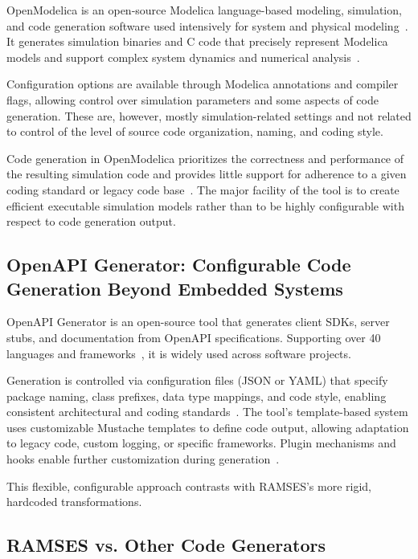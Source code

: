 OpenModelica is an open-source Modelica language-based modeling, simulation, and code generation software used intensively for system and physical modeling~\cite{openmodelica-home}. It generates simulation binaries and C code that precisely represent Modelica models and support complex system dynamics and numerical analysis~\cite{openmodelica-codegen}.

Configuration options are available through Modelica annotations and compiler flags, allowing control over simulation parameters and some aspects of code generation. These are, however, mostly simulation-related settings and not related to control of the level of source code organization, naming, and coding style.

Code generation in OpenModelica prioritizes the correctness and performance of the resulting simulation code and provides little support for adherence to a given coding standard or legacy code base~\cite{openmodelica-performance}. The major facility of the tool is to create efficient executable simulation models rather than to be highly configurable with respect to code generation output.


\subsection*{OpenAPI Generator: Configurable Code Generation Beyond Embedded Systems}

OpenAPI Generator is an open-source tool that generates client SDKs, server stubs, and documentation from OpenAPI specifications. Supporting over 40 languages and frameworks~\cite{openapi-generators}, it is widely used across software projects.

Generation is controlled via configuration files (JSON or YAML) that specify package naming, class prefixes, data type mappings, and code style, enabling consistent architectural and coding standards~\cite{openapi-config}. The tool’s template-based system uses customizable Mustache templates to define code output, allowing adaptation to legacy code, custom logging, or specific frameworks. Plugin mechanisms and hooks enable further customization during generation~\cite{openapi-customization,openapi-plugins}.

This flexible, configurable approach contrasts with RAMSES’s more rigid, hardcoded transformations.


\subsection*{RAMSES vs. Other Code Generators}

